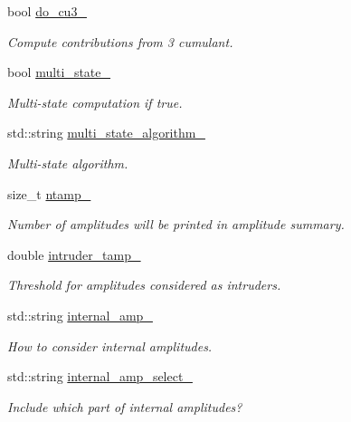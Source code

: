 \begin{DoxyCompactItemize}
bool \mbox{\hyperlink{classforte_1_1_s_a_d_s_r_g_a98c477ebf64751bf6a3c57adb89eed65}{do\+\_\+cu3\+\_\+}}
\begin{DoxyCompactList}\small\item\em Compute contributions from 3 cumulant. \end{DoxyCompactList}\item 
bool \mbox{\hyperlink{classforte_1_1_s_a_d_s_r_g_adc4b0a13d905ef442e7ebe78f376730f}{multi\+\_\+state\+\_\+}}
\begin{DoxyCompactList}\small\item\em Multi-\/state computation if true. \end{DoxyCompactList}\item 
std\+::string \mbox{\hyperlink{classforte_1_1_s_a_d_s_r_g_a3989dffa08d10906b5026da53ffd116f}{multi\+\_\+state\+\_\+algorithm\+\_\+}}
\begin{DoxyCompactList}\small\item\em Multi-\/state algorithm. \end{DoxyCompactList}\item 
size\+\_\+t \mbox{\hyperlink{classforte_1_1_s_a_d_s_r_g_a62a4fc42366af81b1527c5c7da599fc4}{ntamp\+\_\+}}
\begin{DoxyCompactList}\small\item\em Number of amplitudes will be printed in amplitude summary. \end{DoxyCompactList}\item 
double \mbox{\hyperlink{classforte_1_1_s_a_d_s_r_g_a3944a361194a0e48652108475d9956db}{intruder\+\_\+tamp\+\_\+}}
\begin{DoxyCompactList}\small\item\em Threshold for amplitudes considered as intruders. \end{DoxyCompactList}\item 
std\+::string \mbox{\hyperlink{classforte_1_1_s_a_d_s_r_g_af70b04268009dc9f0ed62e094e3c68a9}{internal\+\_\+amp\+\_\+}}
\begin{DoxyCompactList}\small\item\em How to consider internal amplitudes. \end{DoxyCompactList}\item 
std\+::string \mbox{\hyperlink{classforte_1_1_s_a_d_s_r_g_afa9ed215e0a96b1f61ffff4b65dc252a}{internal\+\_\+amp\+\_\+select\+\_\+}}
\begin{DoxyCompactList}\small\item\em Include which part of internal amplitudes? \end{DoxyCompactList}\item 

\end{DoxyCompactItemize}
